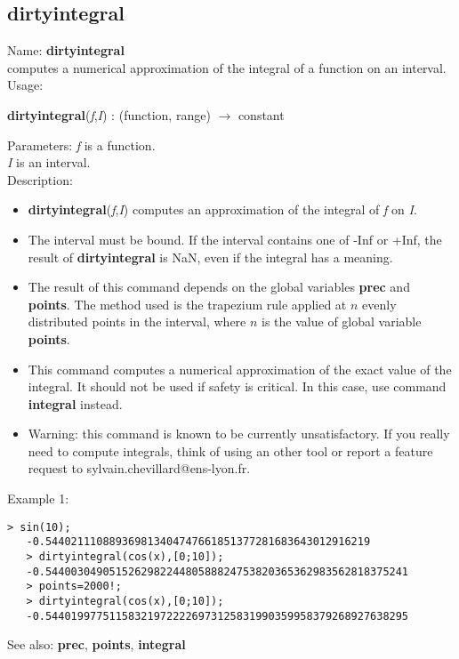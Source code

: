 \subsection{ dirtyintegral }
\noindent Name: \textbf{dirtyintegral}\\
computes a numerical approximation of the integral of a function on an interval.\\

\noindent Usage: 
\begin{center}
\textbf{dirtyintegral}(\emph{f},\emph{I}) : (\textsf{function}, \textsf{range}) $\rightarrow$ \textsf{constant}\\
\end{center}
Parameters: 
\emph{f} is a function.\\
\emph{I} is an interval.\\

\noindent Description: \begin{itemize}

\item \textbf{dirtyintegral}(\emph{f},\emph{I}) computes an approximation of the integral of \emph{f} on \emph{I}.

\item The interval must be bound. If the interval contains one of -Inf or +Inf, the 
   result of \textbf{dirtyintegral} is NaN, even if the integral has a meaning.

\item The result of this command depends on the global variables \textbf{prec} and \textbf{points}.
   The method used is the trapezium rule applied at $n$ evenly distributed
   points in the interval, where $n$ is the value of global variable \textbf{points}.

\item This command computes a numerical approximation of the exact value of the 
   integral. It should not be used if safety is critical. In this case, use
   command \textbf{integral} instead.

\item Warning: this command is known to be currently unsatisfactory. If you really
   need to compute integrals, think of using an other tool or report a feature
   request to sylvain.chevillard@ens-lyon.fr.
\end{itemize}
\noindent Example 1: 
\begin{center}\begin{minipage}{14.8cm}\begin{Verbatim}[frame=single]
   > sin(10);
   -0.544021110889369813404747661851377281683643012916219
   > dirtyintegral(cos(x),[0;10]);
   -0.544003049051526298224480588824753820365362983562818375241
   > points=2000!;
   > dirtyintegral(cos(x),[0;10]);
   -0.544019977511583219722226973125831990359958379268927638295
\end{Verbatim}
\end{minipage}\end{center}
See also: \textbf{prec}, \textbf{points}, \textbf{integral}
